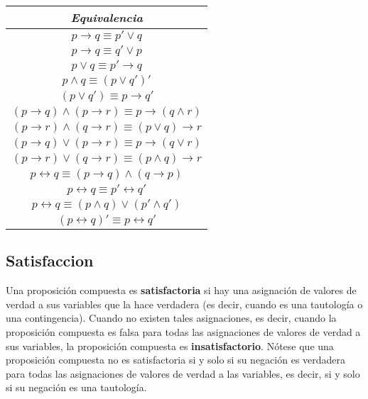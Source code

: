 \documentclass[]{article}
\begin{document}
\begin{table}[H]
{\begin{center}
	\end{center}}
\quad
	\parbox{.5\linewidth}{
	\label{tab:equivalencias-logicas-implicaciones}
	\begin{center}
		\begin{tabular}{|c|}
			\hline
			\textit{Equivalencia}\\
			\hline
			$p \rightarrow q \equiv p' \vee q$\\
			$p \rightarrow q \equiv q' \vee p$\\
			$p \vee q \equiv p' \rightarrow q$\\
			$p \wedge q \equiv (p \vee q')'$\\
			$(p \vee q') \equiv p \rightarrow q'$\\
			$(p \rightarrow q) \wedge (p \rightarrow r) \equiv p \rightarrow (q \wedge r)$\\
			$(p \rightarrow r) \wedge (q \rightarrow r) \equiv (p \vee q) \rightarrow r$\\
			$(p \rightarrow q) \vee (p \rightarrow r) \equiv p \rightarrow (q \vee r)$\\
			$(p \rightarrow r) \vee (q \rightarrow r) \equiv (p \wedge q) \rightarrow r$\\
			\hline
			$p \leftrightarrow q \equiv (p \rightarrow q) \wedge (q \rightarrow p)$\\
			$p \leftrightarrow q \equiv p' \leftrightarrow q'$\\
			$p \leftrightarrow q \equiv (p \wedge q) \vee (p' \wedge q')$\\
			$(p \leftrightarrow q)' \equiv p \leftrightarrow q'$\\
			\hline
			
		\end{tabular}
	\end{center}}
\end{table}

\subsection*{Satisfaccion}

Una proposición compuesta es \textbf{satisfactoria} si hay una asignación de valores de verdad a sus variables que la hace verdadera (es decir, cuando es una tautología o una contingencia). Cuando no existen tales asignaciones, es decir, cuando la proposición compuesta es falsa para todas las asignaciones de valores de verdad a sus variables, la proposición compuesta es \textbf{insatisfactorio}. Nótese que una proposición compuesta no es satisfactoria si y solo si su negación es verdadera para todas las asignaciones de valores de verdad a las variables, es decir, si y solo si su negación es una tautología.
\end{document}
